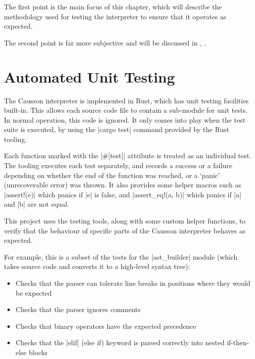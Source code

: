 \documentclass[11pt]{report}
\begin{document}
The first point is the main focus of this chapter, which will describe the methodology used for testing the interpreter to ensure that it operates as expected.

The second point is far more subjective and will be discussed in , \emph{}.

\section{Automated Unit Testing} \label{secUnitTests}

The Causson interpreter is implemented in Rust, which has unit testing facilities built-in. This allows each source code file to contain a sub-module for unit tests. In normal operation, this code is ignored. It only comes into play when the test suite is executed, by using the |cargo test| command provided by the Rust tooling.

Each function marked with the |#[test]| attribute is treated as an individual test. The tooling executes each test separately, and records a success or a failure depending on whether the end of the function was reached, or a `panic' (unrecoverable error) was thrown. It also provides some helper macros such as |assert!(e)| which panics if |e| is false, and |assert_eq!(a, b)| which panics if |a| and |b| are not equal.

This project uses the testing tools, along with some custom helper functions, to verify that the behaviour of specific parts of the Causson interpreter behaves as expected.

For example, this is a subset of the tests for the |ast_builder| module (which takes source code and converts it to a high-level syntax tree):

\begin{itemize}[nosep,topsep=0pt]
    \item Checks that the parser can tolerate line breaks in positions where they would be expected
    
    \item Checks that the parser ignores comments
    
    \item Checks that binary operators have the expected precedence
    
    \item Checks that the |elif| (else if) keyword is parsed correctly into nested if-then-else blocks
\end{itemize}
\end{document}
